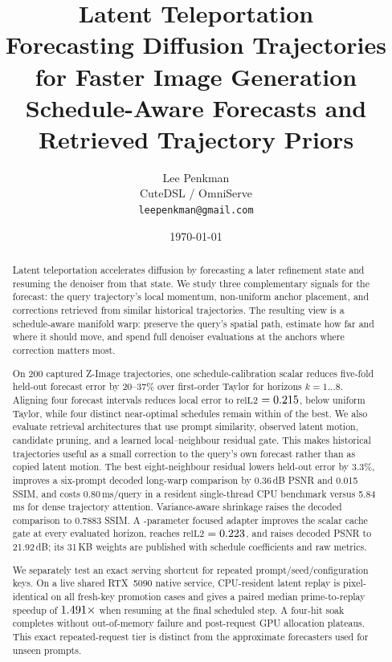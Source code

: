 \documentclass[11pt,a4paper]{article}
\title{\textbf{Latent Teleportation}\\[0.3em]
\large Forecasting Diffusion Trajectories for Faster Image Generation\\
\large Schedule-Aware Forecasts and Retrieved Trajectory Priors}
\author{Lee Penkman\\[0.2em]
\normalsize CuteDSL / OmniServe\\
\normalsize \texttt{leepenkman@gmail.com}}
\date{\today}
\newcommand{\relltwo}{\ensuremath{\mathrm{relL2}}}
\begin{document}
\maketitle

\begin{abstract}
Latent teleportation accelerates diffusion by forecasting a later refinement
state and resuming the denoiser from that state. We study three complementary
signals for the forecast: the query trajectory's local momentum, non-uniform
anchor placement, and corrections retrieved from similar historical
trajectories. The resulting view is a schedule-aware manifold warp: preserve
the query's spatial path, estimate how far and where it should move, and spend
full denoiser evaluations at the anchors where correction matters most.

On 200 captured Z-Image trajectories, one schedule-calibration scalar reduces
five-fold held-out forecast error by 20--37\% over first-order Taylor for
horizons $k=1\ldots8$. Aligning four forecast intervals reduces local error to
\relltwo{} $=0.215$, \AlignedFourImprovement{} below uniform
Taylor, while four distinct near-optimal schedules remain within
\StaggeredGap{} of the best. We also evaluate retrieval architectures that use
prompt similarity, observed latent motion, candidate pruning, and a learned
local--neighbour residual gate. This makes historical trajectories useful as a
small correction to the query's own forecast rather than as copied latent
motion. The best eight-neighbour residual lowers held-out error by 3.3\%,
improves a six-prompt decoded long-warp comparison by 0.36\,dB PSNR and 0.015
SSIM, and costs 0.80\,ms/query in a resident single-thread CPU benchmark versus
5.84\,ms for dense trajectory attention.
Variance-aware shrinkage raises the decoded comparison to 0.7883 SSIM. A
\CacheAdapterParameters-parameter focused adapter improves the scalar cache gate
at every evaluated horizon, reaches \relltwo{} $=0.223$, and
raises decoded PSNR to 21.92\,dB; its 31\,KB weights are published with schedule
coefficients and raw metrics.

We separately test an exact serving shortcut for repeated prompt/seed/configuration
keys. On a live shared RTX~5090 native service, CPU-resident latent replay is
pixel-identical on all fresh-key promotion cases and gives a paired median
prime-to-replay speedup of $1.491\times$ when resuming at
the final scheduled step. A four-hit soak completes without out-of-memory
failure and post-request GPU allocation plateaus. This exact repeated-request
tier is distinct from the approximate forecasters used for unseen prompts.


\end{abstract}
\end{document}
